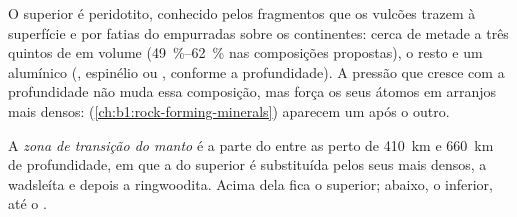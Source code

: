 O  superior é peridotito, conhecido pelos fragmentos que os vulcões trazem à superfície e por fatias do  empurradas sobre os continentes: cerca de metade a três quintos de  em volume (\qtyrange{49}{62}{\percent} nas composições propostas), o resto  e um  alumínico (, espinélio ou , conforme a profundidade). A pressão que cresce com a profundidade não muda essa composição, mas força os seus átomos em arranjos mais densos:  (\cref{ch:b1:rock-forming-minerals}) aparecem um após o outro.

\begin{definition}\label{def:b1:layered-earth:transition-zone}
A \emph{zona de transição do manto} é a parte do  entre as  perto de \qty{410}{km} e \qty{660}{km} de profundidade, em que a  do  superior é substituída pelos seus  mais densos, a wadsleíta e depois a ringwoodita. Acima dela fica o  superior; abaixo, o  inferior, até o .
\end{definition}

